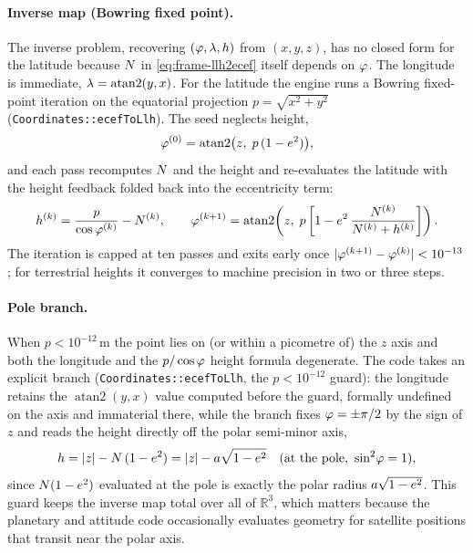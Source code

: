 \documentclass[main.tex]{subfiles}
\begin{document}
\paragraph{Inverse map (Bowring fixed point).}
The inverse problem, recovering $(\varphi,\lambda,h)$ from
$(x,y,z)$, has no closed form for the latitude because $N$ in
\eqref{eq:frame-llh2ecef} itself depends on $\varphi$.  The longitude is
immediate, $\lambda = \operatorname{atan2}(y,x)$.  For the latitude the
engine runs a Bowring fixed-point iteration on the equatorial projection
$p = \sqrt{x^2+y^2}$ (\texttt{Coordinates::ecefToLlh}).
The seed neglects height,
\begin{equation}
\varphi^{(0)} = \operatorname{atan2}\!\big(z,\; p\,(1-e^{2})\big),
\label{eq:frame-bowring-seed}
\end{equation}
and each pass recomputes $N$ and the height and re-evaluates the
latitude with the height feedback folded back into the eccentricity term:
\begin{equation}
h^{(k)} = \frac{p}{\cos\varphi^{(k)}} - N^{(k)},
\qquad
\varphi^{(k+1)} = \operatorname{atan2}\!\left(z,\;
p\left[1 - e^{2}\,\frac{N^{(k)}}{N^{(k)}+h^{(k)}}\right]\right).
\label{eq:frame-bowring-iter}
\end{equation}
The iteration is capped at ten passes and exits early once
$|\varphi^{(k+1)}-\varphi^{(k)}| < 10^{-13}$; for terrestrial heights it
converges to machine precision in two or three steps.

\paragraph{Pole branch.}
When $p < 10^{-12}\,\mathrm{m}$ the point lies on (or within a
picometre of) the $z$ axis and both the longitude and the
$p/\cos\varphi$ height formula degenerate.  The code takes an explicit
branch (\texttt{Coordinates::ecefToLlh}, the $p<10^{-12}$ guard): the
longitude retains the $\operatorname{atan2}(y,x)$ value computed before
the guard, formally undefined on the axis and immaterial there,
while the branch fixes $\varphi = \pm\pi/2$ by the sign of $z$ and reads
the height directly off the polar semi-minor axis,
\begin{equation}
h = |z| - N\,(1-e^{2})
       = |z| - a\sqrt{1-e^{2}} \quad (\text{at the pole, } \sin^2\!\varphi = 1),
\label{eq:frame-pole}
\end{equation}
since $N(1-e^{2})$ evaluated at the pole is exactly the polar
radius $a\sqrt{1-e^{2}}$.  This guard keeps the inverse map total
over all of $\mathbb{R}^3$, which matters because the planetary and
attitude code occasionally evaluates geometry for satellite positions
that transit near the polar axis.
\end{document}
